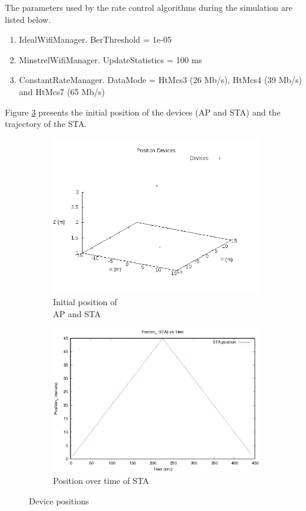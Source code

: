 \documentclass[12]{article}
\begin{document}
The parameters used by the rate control algorithms during the simulation are listed below.

\begin{enumerate}
 \item IdealWifiManager. BerThreshold = 1e-05
 \item MinstrelWifiManager. UpdateStatistics = 100 ms
 \item ConstantRateManager. DataMode = HtMcs3 (26 Mb/s), HtMcs4 (39 Mb/s) and HtMcs7 (65 Mb/s)
\end{enumerate}

Figure \ref{fig:location} presents the initial position of the devices (AP and STA) and the trajectory of the STA. 

\begin{figure}[!htb]
\begin{subfigure}{.5\textwidth}
  \centering
  \includegraphics[width=\linewidth]{"20Mhz_Long_1SS_0AU/Ideal/PosDevices"}
  \caption{Initial position of\\ AP and STA}
  \label{fig:init_loc}
\end{subfigure}%
\begin{subfigure}{.5\textwidth}
  \includegraphics[width=\linewidth]{"20Mhz_Long_1SS_0AU/Ideal/TimePosition"}
  \caption{Position over time of STA}
  \label{fig:loc_time}
\end{subfigure}%
\caption{Device positions}
\label{fig:location}
\end{figure}
\end{document}
